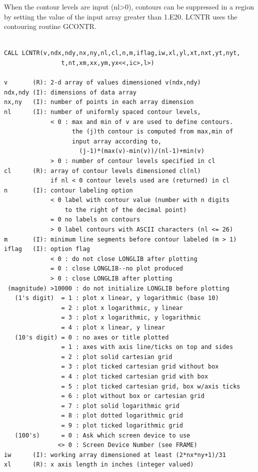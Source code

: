 \documentclass[11pt]{report}
\begin{document}
When the contour levels are input (nl>0), contours can be suppressed
in a region by setting the value of the input array greater than 1.E20.
LCNTR uses the contouring routine GCONTR.
\begin{verbatim}

CALL LCNTR(v,ndx,ndy,nx,ny,nl,cl,n,m,iflag,iw,xl,yl,xt,nxt,yt,nyt,
                t,nt,xm,xx,ym,yx<<,ic>,l>)

v       (R): 2-d array of values dimensioned v(ndx,ndy)
ndx,ndy (I): dimensions of data array
nx,ny   (I): number of points in each array dimension
nl      (I): number of uniformly spaced contour levels,
             < 0 : max and min of v are used to define contours.
                   the (j)th contour is computed from max,min of 
                   input array according to,
                     (j-1)*(max(v)-min(v))/(nl-1)+min(v)
             > 0 : number of contour levels specified in cl
cl      (R): array of contour levels dimensioned cl(nl)
             if nl < 0 contour levels used are (returned) in cl
n       (I): contour labeling option
             < 0 label with contour value (number with n digits
                 to the right of the decimal point)
             = 0 no labels on contours
             > 0 label contours with ASCII characters (nl <= 26)
m       (I): minimum line segments before contour labeled (m > 1)
iflag   (I): option flag
             < 0 : do not close LONGLIB after plotting
             = 0 : close LONGLIB--no plot produced
             > 0 : close LONGLIB after plotting
 (magnitude) >10000 : do not initialize LONGLIB before plotting
   (1's digit)  = 1 : plot x linear, y logarithmic (base 10)
                = 2 : plot x logarithmic, y linear
                = 3 : plot x logarithmic, y logarithmic
                = 4 : plot x linear, y linear
   (10's digit) = 0 : no axes or title plotted
                = 1 : axes with axis line/ticks on top and sides
                = 2 : plot solid cartesian grid
                = 3 : plot ticked cartesian grid without box
                = 4 : plot ticked cartesian grid with box
                = 5 : plot ticked cartesian grid, box w/axis ticks
                = 6 : plot without box or cartesian grid
                = 7 : plot solid logarithmic grid
                = 8 : plot dotted logarithmic grid
                = 9 : plot ticked logarithmic grid
   (100's)      = 0 : Ask which screen device to use
               <> 0 : Screen Device Number (see FRAME)
iw      (I): working array dimensioned at least (2*nx*ny+1)/31
xl      (R): x axis length in inches (integer valued)

\end{verbatim}
\end{document}
